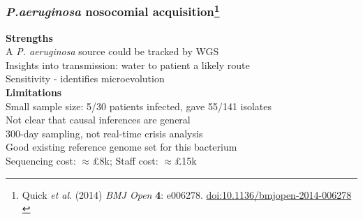\begin{frame}
  \frametitle{\textit{P.aeruginosa} nosocomial acquisition\footnote{\tiny{Quick \textit{et al}. (2014) \textit{BMJ Open} \textbf{4}: e006278. \href{http://dx.doi.org/10.1136/bmjopen-2014-006278}{doi:10.1136/bmjopen-2014-006278}}\\}}
  \textbf{Strengths} \\
  A \textit{P. aeruginosa} source could be tracked by WGS \\
  Insights into transmission: water to patient a likely route \\
  Sensitivity - identifies microevolution \\
  \textbf{Limitations} \\
  Small sample size: 5/30 patients infected, gave 55/141 isolates  \\
  Not clear that causal inferences are general \\
  300-day sampling, not real-time crisis analysis \\
  Good existing reference genome set for this bacterium \\
  Sequencing cost: $\approx$\pounds8k; Staff cost: $\approx$\pounds15k
\end{frame}